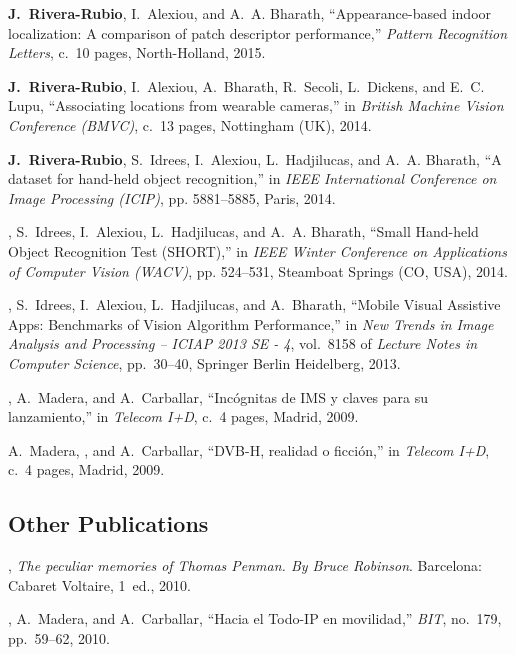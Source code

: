 \begin{thebibliography}{3}

\textbf{J.~Rivera-Rubio}, I.~Alexiou, and A.~A. Bharath, ``{Appearance-based indoor
  localization: A comparison of patch descriptor performance},'' {\em Pattern
  Recognition Letters}, c.~10 pages, North-Holland, 2015.

\textbf{J.~Rivera-Rubio}, I.~Alexiou, A.~Bharath, R.~Secoli, L.~Dickens, and E.~C. Lupu,
  ``{Associating locations from wearable cameras},'' in {\em British Machine
  Vision Conference (BMVC)}, c.~13 pages, Nottingham (UK), 2014.


\textbf{J.~Rivera-Rubio}, S.~Idrees, I.~Alexiou, L.~Hadjilucas, and A.~A. Bharath, ``{A
  dataset for hand-held object recognition},'' in {\em IEEE International
  Conference on Image Processing (ICIP)}, pp. 5881--5885, Paris, 2014.

, S.~Idrees, I.~Alexiou, L.~Hadjilucas, and A.~A. Bharath,
  ``{Small Hand-held Object Recognition Test (SHORT)},'' in {\em IEEE Winter
  Conference on Applications of Computer Vision (WACV)}, pp. 524--531, Steamboat Springs
  (CO, USA), 2014.

, S.~Idrees, I.~Alexiou, L.~Hadjilucas, and A.~Bharath,
  ``{Mobile Visual Assistive Apps: Benchmarks of Vision Algorithm
  Performance},'' in {\em New Trends in Image Analysis and Processing -- ICIAP
  2013 SE - 4}, vol.~8158 of {\em Lecture Notes in Computer Science},
  pp.~30--40, Springer Berlin Heidelberg, 2013.

, A.~Madera, and A.~Carballar, ``{Inc\'{o}gnitas de IMS y claves
  para su lanzamiento},'' in {\em Telecom I+D}, c.~4 pages, Madrid, 2009.

A.~Madera, , and A.~Carballar, ``{DVB-H, realidad o
  ficci\'{o}n},'' in {\em Telecom I+D}, c.~4 pages, Madrid, 2009.
  
\end{thebibliography}

\subsection{Other Publications}

\begin{thebibliography}{2}

, {\em {The peculiar memories of Thomas Penman.
  By Bruce Robinson}}.
\newblock Barcelona: Cabaret Voltaire, 1~ed., 2010.

, A.~Madera, and A.~Carballar, ``{Hacia el Todo-IP en
  movilidad},'' {\em BIT}, no.~179, pp.~59--62, 2010.

\end{thebibliography}
